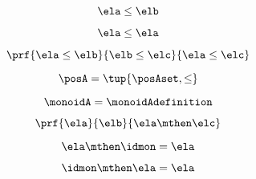 \begin{forslides}
    \begin{equation}
        \label{eq:semicats-slides-138}
        \ela \leq \elb
    \end{equation}

    \begin{equation}
        \label{eq:semicats-slides-139}
        \ela \leq \ela
    \end{equation}

    \begin{equation}
        \label{eq:semicats-slides-140}
        \prf{
            \ela \leq \elb
        }{
            \elb \leq \elc
        }{
            \ela \leq \elc
        }
    \end{equation}

    \begin{equation}
        \label{eq:semicats-slides-141}
        \posA = \tup{\posAset, \leq}
    \end{equation}

    \begin{equation}
        \label{eq:semicats-slides-142}
        \monoidA = \monoidAdefinition
    \end{equation}

    \begin{equation}
        \label{eq:semicats-slides-143}
        \prf{
            \ela
        }{
            \elb
        }{
            \ela \mthen \elc
        }
    \end{equation}

    \begin{equation}
        \label{eq:semicats-slides-144}
        \ela \mthen \idmon = \ela
    \end{equation}

    \begin{equation}
        \label{eq:semicats-slides-145}
        \idmon \mthen \ela = \ela
    \end{equation}

    \begin{comment}
    \begin{equation}
        \label{eq:semicats-slides-146}

    \end{equation}

    \begin{equation}
        \label{eq:semicats-slides-147}

    \end{equation}

    \begin{equation}
        \label{eq:semicats-slides-148}


\end{comment}
\end{forslides}
